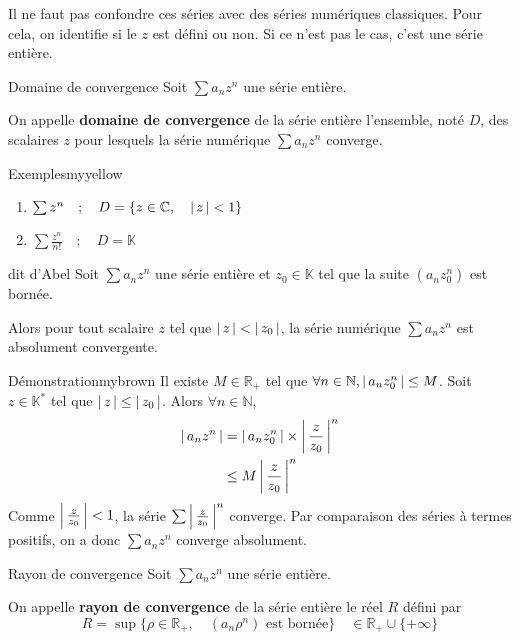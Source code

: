     Il ne faut pas confondre ces séries avec des séries numériques classiques. Pour cela, on identifie si le $z$ est défini ou non. Si ce n’est pas le cas, c’est une série entière.

    \begin{defi}{Domaine de convergence}{}
        Soit $\sum a_n z^n$ une série entière.

        On appelle \textbf{domaine de convergence} de la série entière l’ensemble, noté $D$, des scalaires $z$ pour lesquels la série numérique $\sum a_n z^n$ converge.
    \end{defi}

    \begin{omed}{Exemples}{myyellow}
        \begin{enumerate}[label=\textcolor{myyellow}{\arabic*.}]
            \item $\sum z^n \quad ; \quad D = \left\{z \in \mathbb{C}, \quad \left\lvert \,z \, \right\rvert < 1\right\}$
            \item $\sum \frac{z^n}{n!} \quad ; \quad D = \mathbb{K}$
        \end{enumerate}
    \end{omed}

    \begin{lem}{dit d’Abel}{}
        Soit $\sum a_n z^n$ une série entière et $z_0 \in \mathbb{K}$ tel que la suite $(a_n z_0^n)$ est bornée. 

        Alors pour tout scalaire $z$ tel que $\left\lvert \,z \, \right\rvert < \left\lvert \,z_0 \, \right\rvert$, la série numérique $\sum a_n z^n$ est absolument convergente.
    \end{lem}

    \begin{demo}{Démonstration}{mybrown}
        Il existe $M \in \mathbb{R}_+$ tel que $\forall n \in \mathbb{N}, \left\lvert \,a_n z_0^n \, \right\rvert \leq M$. Soit $z \in \mathbb{K}^*$ tel que $\left\lvert \,z \, \right\rvert \leq \left\lvert \,z_0 \, \right\rvert$. Alors $\forall n \in \mathbb{N}$,
        \begin{align*}
            \left\lvert \,a_n z^n \, \right\rvert 
            &= \left\lvert \,a_n z_0^n \, \right\rvert \times \left\lvert \,\frac{z}{z_0} \, \right\rvert^n \\
            &\leq M \left\lvert \,\frac{z}{z_0} \, \right\rvert^n
        \end{align*}
        Comme $\left\lvert \,\frac{z}{z_0} \, \right\rvert < 1$, la série $\sum \left\lvert \,\frac{z}{z_0} \, \right\rvert^n$ converge. Par comparaison des séries à termes positifs, on a donc $\sum a_n z^n$ converge absolument.
    \end{demo}

    \begin{defi}{Rayon de convergence}{}
        Soit $\sum a_n z^n$ une série entière.

        On appelle \textbf{rayon de convergence} de la série entière le réel $R$ défini par 
        \[ R = \sup \big\{ \rho \in \mathbb{R}_+,\quad (a_n \rho^n) \text{ est bornée} \big\} \quad \in \mathbb{R}_+ \cup \{ +\infty \} \]
    \end{defi}

